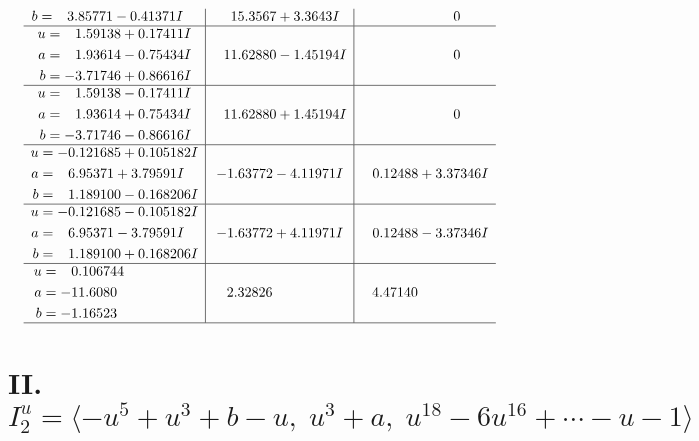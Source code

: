\documentclass[1p]{elsarticle_modified}
\theoremstyle{definition}
\begin{document}
$$\begin{array}{c|c|c}
\begin{aligned}
b &= \phantom{-}3.85771 - 0.41371 I\end{aligned}
 & \phantom{-}15.3567 + 3.3643 I & \phantom{-0.000000 } 0 \\ \hline\begin{aligned}
u &= \phantom{-}1.59138 + 0.17411 I \\
a &= \phantom{-}1.93614 - 0.75434 I \\
b &= -3.71746 + 0.86616 I\end{aligned}
 & \phantom{-}11.62880 - 1.45194 I & \phantom{-0.000000 } 0 \\ \hline\begin{aligned}
u &= \phantom{-}1.59138 - 0.17411 I \\
a &= \phantom{-}1.93614 + 0.75434 I \\
b &= -3.71746 - 0.86616 I\end{aligned}
 & \phantom{-}11.62880 + 1.45194 I & \phantom{-0.000000 } 0 \\ \hline\begin{aligned}
u &= -0.121685 + 0.105182 I \\
a &= \phantom{-}6.95371 + 3.79591 I \\
b &= \phantom{-}1.189100 - 0.168206 I\end{aligned}
 & -1.63772 - 4.11971 I & \phantom{-}0.12488 + 3.37346 I \\ \hline\begin{aligned}
u &= -0.121685 - 0.105182 I \\
a &= \phantom{-}6.95371 - 3.79591 I \\
b &= \phantom{-}1.189100 + 0.168206 I\end{aligned}
 & -1.63772 + 4.11971 I & \phantom{-}0.12488 - 3.37346 I \\ \hline\begin{aligned}
u &= \phantom{-}0.106744\phantom{ +0.000000I} \\
a &= -11.6080\phantom{ +0.000000I} \\
b &= -1.16523\phantom{ +0.000000I}\end{aligned}
 & \phantom{-}2.32826\phantom{ +0.000000I} & \phantom{-}4.47140\phantom{ +0.000000I}\\
 \hline 
 \end{array}$$\newpage\newpage\renewcommand{\arraystretch}{1}
\centering \section*{II. $I^u_{2}= \langle - u^5+u^3+b- u,\;u^3+a,\;u^{18}-6 u^{16}+\cdots- u-1 \rangle$}
\end{document}
